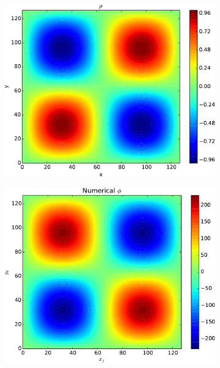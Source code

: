 	\begin{figure}
		\centering
			\begin{subfigure}[b]{0.6\textwidth}
				\includegraphics[width = \textwidth]{figures/verification/analytical/sinusoidal/rho.pdf}
			\end{subfigure}
			\begin{subfigure}[b]{0.6\textwidth}
				\includegraphics[width = \textwidth]{figures/verification/analytical/sinusoidal/numerical.pdf}
			\end{subfigure}
			\begin{subfigure}[b]{0.6\textwidth}

\end{subfigure}
\end{figure}
